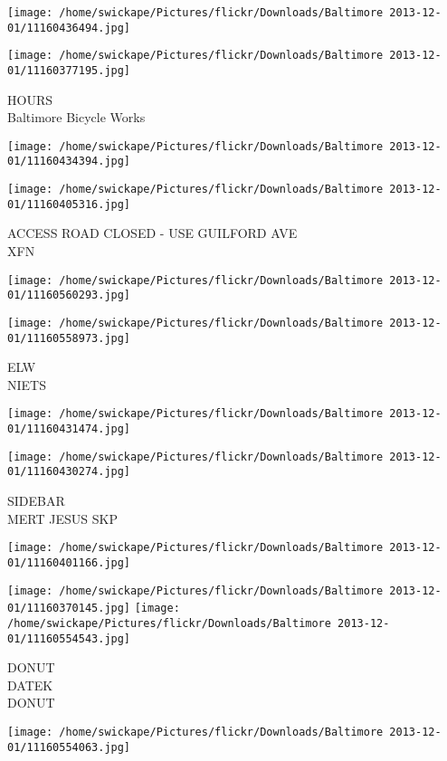 \documentclass[10pt,letterpaper]{article}
\begin{document}
\texttt{[image: /home/swickape/Pictures/flickr/Downloads/Baltimore 2013-12-01/11160436494.jpg]}

\vspace{0.25in}
\texttt{[image: /home/swickape/Pictures/flickr/Downloads/Baltimore 2013-12-01/11160377195.jpg]}

HOURS\\
Baltimore Bicycle Works
\pagebreak

\texttt{[image: /home/swickape/Pictures/flickr/Downloads/Baltimore 2013-12-01/11160434394.jpg]}

\vspace{0.25in}
\texttt{[image: /home/swickape/Pictures/flickr/Downloads/Baltimore 2013-12-01/11160405316.jpg]}

ACCESS ROAD CLOSED {-} USE GUILFORD AVE\\
XFN
\pagebreak

\texttt{[image: /home/swickape/Pictures/flickr/Downloads/Baltimore 2013-12-01/11160560293.jpg]}

\vspace{0.25in}
\texttt{[image: /home/swickape/Pictures/flickr/Downloads/Baltimore 2013-12-01/11160558973.jpg]}

ELW\\
NIETS
\pagebreak

\texttt{[image: /home/swickape/Pictures/flickr/Downloads/Baltimore 2013-12-01/11160431474.jpg]}

\vspace{0.25in}
\texttt{[image: /home/swickape/Pictures/flickr/Downloads/Baltimore 2013-12-01/11160430274.jpg]}

SIDEBAR\\
MERT JESUS SKP
\pagebreak

\texttt{[image: /home/swickape/Pictures/flickr/Downloads/Baltimore 2013-12-01/11160401166.jpg]}

\vspace{0.25in}
\texttt{[image: /home/swickape/Pictures/flickr/Downloads/Baltimore 2013-12-01/11160370145.jpg]}
\texttt{[image: /home/swickape/Pictures/flickr/Downloads/Baltimore 2013-12-01/11160554543.jpg]}

DONUT\\
DATEK\\
DONUT
\pagebreak

\texttt{[image: /home/swickape/Pictures/flickr/Downloads/Baltimore 2013-12-01/11160554063.jpg]}
\end{document}
